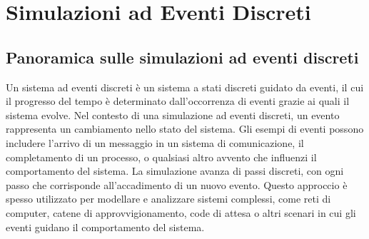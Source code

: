 \documentclass[12pt,a4paper,openright,twoside]{book}
\begin{document}





% 


\chapter{Simulazioni ad Eventi Discreti}
\section{Panoramica sulle simulazioni ad eventi discreti}
\label{sec:panoramica-des}
Un sistema ad eventi discreti è un sistema a stati discreti guidato da eventi, il cui il progresso del tempo è determinato dall'occorrenza di eventi grazie ai quali il sistema evolve. Nel contesto di una simulazione ad eventi discreti, un evento rappresenta un cambiamento nello stato del sistema. 
Gli esempi di eventi possono includere l'arrivo di un messaggio in un sistema di comunicazione, il completamento di un processo, o qualsiasi altro avvento che influenzi il comportamento del sistema. La simulazione avanza di passi discreti, con ogni passo che corrisponde all'accadimento di un nuovo evento. 
Questo approccio è spesso utilizzato per modellare e analizzare sistemi complessi, come reti di computer, catene di approvvigionamento, code di attesa o altri scenari in cui gli eventi guidano il comportamento del sistema. 
\end{document}
